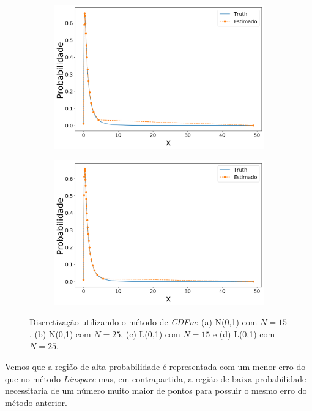 \begin{figure}[H]
	
	\begin{subfigure}[b]{0.45\textwidth}
		\centering 
		\includegraphics[width=\linewidth]{./figuras/CDFm_lognormal_15}
		\caption{}
		\label{fig:cdf_log15}
	\end{subfigure}
	\hfill
	\begin{subfigure}[b]{0.45\textwidth}
		\centering 
		\includegraphics[width=\linewidth]{./figuras/CDFm_lognormal_25}
		\caption{}
		\label{fig:cdf_log25}
	\end{subfigure}
	
	\caption{Discretização utilizando o método de \textit{CDFm}: (a) N(0,1) com $N = 15$, (b) N(0,1) com $N = 25$, (c) L(0,1) com $N = 15$ e (d) L(0,1) com $N = 25$.}
	\label{fig:cdfnorm}
\end{figure}

Vemos que a região de alta probabilidade é representada com um menor erro do que no método \textit{Linspace} mas, em contrapartida, a região de baixa probabilidade necessitaria de um número muito maior de pontos para possuir o mesmo erro do método anterior.

